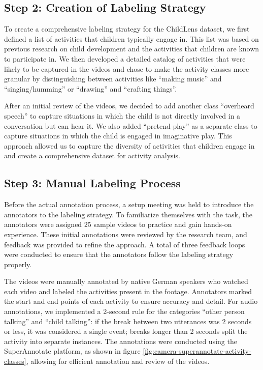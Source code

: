 \documentclass[
  man,floatsintext]{apa6}
\begin{document}
\subsection{Step 2: Creation of Labeling Strategy}\label{step-2-creation-of-labeling-strategy}

To create a comprehensive labeling strategy for the ChildLens dataset, we first defined a list of activities that children typically engage in. This list was based on previous research on child development and the activities that children are known to participate in. We then developed a detailed catalog of activities that were likely to be captured in the videos and chose to make the activity classes more granular by distinguishing between activities like ``making music'' and ``singing/humming'' or ``drawing'' and ``crafting things''.

After an initial review of the videos, we decided to add another class ``overheard speech'' to capture situations in which the child is not directly involved in a conversation but can hear it. We also added ``pretend play'' as a separate class to capture situations in which the child is engaged in imaginative play. This approach allowed us to capture the diversity of activities that children engage in and create a comprehensive dataset for activity analysis.

\subsection{Step 3: Manual Labeling Process}\label{step-3-manual-labeling-process}

Before the actual annotation process, a setup meeting was held to introduce the annotators to the labeling strategy. To familiarize themselves with the task, the annotators were assigned 25 sample videos to practice and gain hands-on experience. These initial annotations were reviewed by the research team, and feedback was provided to refine the approach. A total of three feedback loops were conducted to ensure that the annotators follow the labeling strategy properly.

The videos were manually annotated by native German speakers who watched each video and labeled the activities present in the footage. Annotators marked the start and end points of each activity to ensure accuracy and detail. For audio annotations, we implemented a 2-second rule for the categories ``other person talking'' and ``child talking'': if the break between two utterances was 2 seconds or less, it was considered a single event; breaks longer than 2 seconds split the activity into separate instances. The annotations were conducted using the SuperAnnotate platform, as shown in figure \ref{fig:camera-superannotate-activity-classes}, allowing for efficient annotation and review of the videos.
\end{document}
